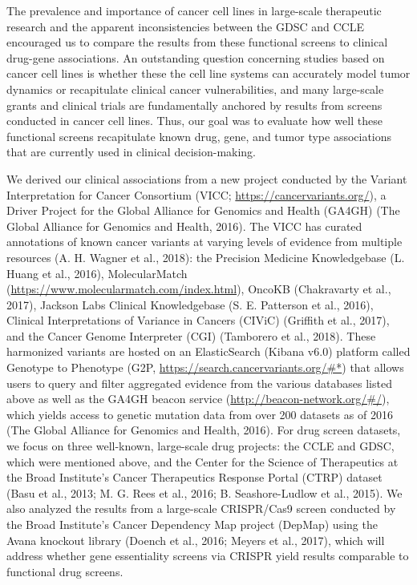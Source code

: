 \documentclass[man,floatsintext]{apa6}
\begin{document}
The prevalence and importance of cancer cell lines in large-scale
therapeutic research and the apparent inconsistencies between the GDSC
and CCLE encouraged us to compare the results from these functional
screens to clinical drug-gene associations. An outstanding question
concerning studies based on cancer cell lines is whether these the cell
line systems can accurately model tumor dynamics or recapitulate
clinical cancer vulnerabilities, and many large-scale grants and
clinical trials are fundamentally anchored by results from screens
conducted in cancer cell lines. Thus, our goal was to evaluate how well
these functional screens recapitulate known drug, gene, and tumor type
associations that are currently used in clinical decision-making.

We derived our clinical associations from a new project conducted by the
Variant Interpretation for Cancer Consortium (VICC;
\url{https://cancervariants.org/}), a Driver Project for the Global
Alliance for Genomics and Health (GA4GH) (The Global Alliance for
Genomics and Health, 2016). The VICC has curated annotations of known
cancer variants at varying levels of evidence from multiple resources
(A. H. Wagner et al., 2018): the Precision Medicine Knowledgebase (L.
Huang et al., 2016), MolecularMatch
(\url{https://www.molecularmatch.com/index.html}), OncoKB (Chakravarty
et al., 2017), Jackson Labs Clinical Knowledgebase (S. E. Patterson et
al., 2016), Clinical Interpretations of Variance in Cancers (CIViC)
(Griffith et al., 2017), and the Cancer Genome Interpreter (CGI)
(Tamborero et al., 2018). These harmonized variants are hosted on an
ElasticSearch (Kibana v6.0) platform called Genotype to Phenotype (G2P,
\url{https://search.cancervariants.org/\#*}) that allows users to query
and filter aggregated evidence from the various databases listed above
as well as the GA4GH beacon service
(\url{http://beacon-network.org/\#/}), which yields access to genetic
mutation data from over 200 datasets as of 2016 (The Global Alliance for
Genomics and Health, 2016). For drug screen datasets, we focus on three
well-known, large-scale drug projects: the CCLE and GDSC, which were
mentioned above, and the Center for the Science of Therapeutics at the
Broad Institute's Cancer Therapeutics Response Portal (CTRP) dataset
(Basu et al., 2013; M. G. Rees et al., 2016; B. Seashore-Ludlow et al.,
2015). We also analyzed the results from a large-scale CRISPR/Cas9
screen conducted by the Broad Institute's Cancer Dependency Map project
(DepMap) using the Avana knockout library (Doench et al., 2016; Meyers
et al., 2017), which will address whether gene essentiality screens via
CRISPR yield results comparable to functional drug screens.
\end{document}
